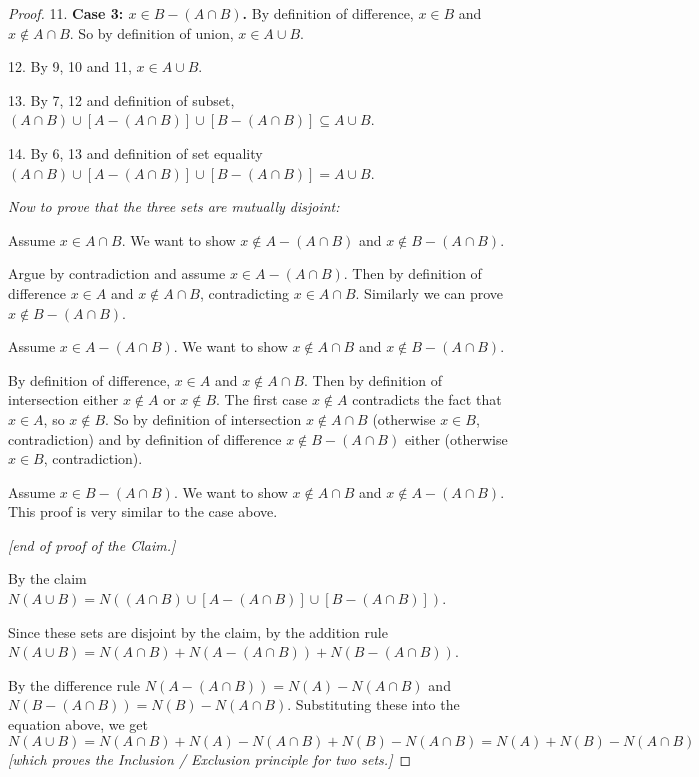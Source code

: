 \documentclass[14pt]{extarticle}
\begin{document}
\begin{proof}
11. {\bf Case 3: \(x \in B - (A \cap B)\).} By definition of difference, \(x \in B\) and \(x \notin A \cap B\). So by 
definition of union, \(x \in A \cup B\).

12. By 9, 10 and 11, \(x \in A \cup B\).

13. By 7, 12 and definition of subset, \((A \cap B) \cup [A - (A \cap B)] \cup [B - (A \cap B)] \subseteq A \cup B\).

14. By 6, 13 and definition of set equality \((A \cap B) \cup [A - (A \cap B)] \cup [B - (A \cap B)] = A \cup B\).

{\it Now to prove that the three sets are mutually disjoint:}

Assume \(x \in A \cap B\). We want to show \(x \notin A - (A \cap B)\) and \(x \notin B - (A \cap B)\). 

Argue by contradiction and assume \(x \in A - (A \cap B)\). Then by definition of difference \(x \in A\) and \(x \notin 
A \cap B\), contradicting \(x \in A\cap B\). Similarly we can prove \(x \notin B - (A \cap B)\).

Assume \(x \in A - (A \cap B)\). We want to show \(x \notin A \cap B\) and \(x \notin B - (A \cap B)\). 

By definition of difference, \(x \in A\) and \(x \notin A \cap B\). Then by definition of intersection either 
\(x \notin A\) or \(x \notin B\). The first case \(x \notin A\) contradicts the fact that \(x\in A\), so \(x\notin B\). 
So by definition of intersection \(x \notin A \cap B\) (otherwise \(x \in B\), contradiction) and by definition of 
difference \(x \notin B - (A \cap B)\) either (otherwise \(x \in B\), contradiction).

Assume \(x \in B - (A \cap B)\). We want to show \(x \notin A \cap B\) and \(x \notin A - (A \cap B)\). This proof is 
very similar to the case above.

{\it [end of proof of the Claim.]}

By the claim \(N(A \cup B) = N((A \cap B) \cup [A - (A \cap B)] \cup [B - (A \cap B)])\).

Since these sets are disjoint by the claim, by the addition rule \(N(A \cup B) = N(A \cap B) + N(A - (A \cap B)) + N(B 
- (A \cap B)).\)

By the difference rule \(N(A - (A \cap B)) = N(A) - N(A \cap B)\) and \(N(B - (A \cap B)) = N(B) - N(A \cap B)\).
Substituting these into the equation above, we get
\[
N(A \cup B) = N(A \cap B) + N(A) - N(A \cap B) + N(B) - N(A \cap B) = N(A) + N(B) - N(A \cap B)
\]
{\it [which proves the Inclusion / Exclusion principle for two sets.]}
\end{proof}
\end{document}
